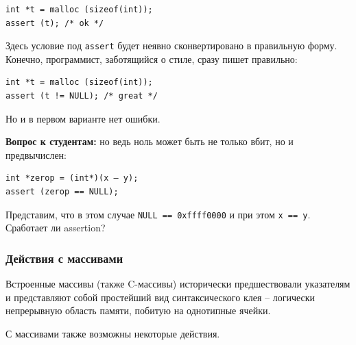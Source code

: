 \documentclass[a4paper,12pt,oneside]{article}
\newif\ifanswers
\begin{document}
\begin{lstlisting}
int *t = malloc (sizeof(int));
assert (t); /* ok */
\end{lstlisting}

Здесь условие под \lstinline!assert! будет неявно сконвертировано в правильную форму. Конечно, программист, заботящийся о стиле, сразу пишет правильно:

\begin{lstlisting}
int *t = malloc (sizeof(int));
assert (t != NULL); /* great */
\end{lstlisting}

Но и в первом варианте нет ошибки.

\textbf{Вопрос к студентам:} но ведь ноль может быть не только вбит, но и предвычислен:

\begin{lstlisting}
int *zerop = (int*)(x – y);
assert (zerop == NULL);
\end{lstlisting}

Представим, что в этом случае \lstinline!NULL == 0xffff0000! и при этом \lstinline!x == y!. Сработает ли assertion?

\ifanswers
Правильный ответ: увы, нет. Стандарт гарантирует стабильное обращение с нулями времени компиляции, но не нулями времени исполнения, иначе проверками пришлось бы завешивать слишком много кода.
\fi

\subsubsection{Действия с массивами}

Встроенные массивы (также C-массивы) исторически предшествовали указателям и представляют собой простейший вид синтаксического клея -- логически непрерывную область памяти, побитую на однотипные ячейки.

С массивами также возможны некоторые действия.
\end{document}
